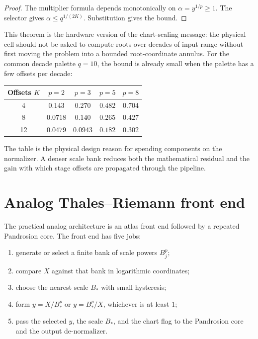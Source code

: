 \documentclass[11pt]{article}
\begin{document}
\begin{proof}
The multiplier formula depends monotonically on
\(\alpha=y^{1/p}\ge1\).  The selector gives
\(\alpha\le q^{1/(2K)}\).  Substitution gives the bound.
\end{proof}

This theorem is the hardware version of the chart-scaling message: the
physical cell should not be asked to compute roots over decades of input
range without first moving the problem into a bounded root-coordinate annulus.
For the common decade palette \(q=10\), the bound is already small when the
palette has a few offsets per decade:

\begin{center}
\small
\begin{tabular}{@{}ccccc@{}}
\toprule
Offsets \(K\) & \(p=2\) & \(p=3\) & \(p=5\) & \(p=8\)\\
\midrule
4  & \(0.143\) & \(0.270\) & \(0.482\) & \(0.704\)\\
8  & \(0.0718\) & \(0.140\) & \(0.265\) & \(0.427\)\\
12 & \(0.0479\) & \(0.0943\) & \(0.182\) & \(0.302\)\\
\bottomrule
\end{tabular}
\end{center}

The table is the physical design reason for spending components on the
normalizer.  A denser scale bank reduces both the mathematical residual and the
gain with which stage offsets are propagated through the pipeline.

\section{Analog Thales--Riemann front end}

The practical analog architecture is an atlas front end followed by a repeated
Pandrosion core.  The front end has five jobs:
\begin{enumerate}[leftmargin=2em]
\item generate or select a finite bank of scale powers \(B_j^p\);
\item compare \(X\) against that bank in logarithmic coordinates;
\item choose the nearest scale \(B_*\) with small hysteresis;
\item form \(y=X/B_*^p\) or \(y=B_*^p/X\), whichever is at least \(1\);
\item pass the selected \(y\), the scale \(B_*\), and the chart flag to the
Pandrosion core and the output de-normalizer.
\end{enumerate}
\end{document}
